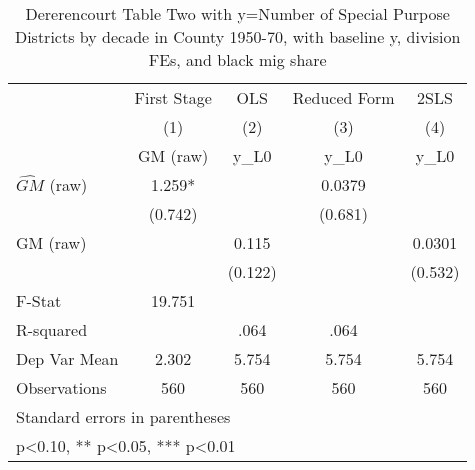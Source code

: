 \begin{table}[htbp]\centering
\def\sym#1{\ifmmode^{#1}\else\(^{#1}\)\fi}
\caption{Dererencourt Table Two with y=Number of Special Purpose Districts by decade in County 1950-70, with baseline y, division FEs, and black mig share}
\begin{tabular}{l*{4}{c}}
\toprule
                    & First Stage   &         OLS   &Reduced Form   &        2SLS   \\
                    &\multicolumn{1}{c}{(1)}&\multicolumn{1}{c}{(2)}&\multicolumn{1}{c}{(3)}&\multicolumn{1}{c}{(4)}\\
                    &\multicolumn{1}{c}{GM  (raw)}&\multicolumn{1}{c}{y\_L0}&\multicolumn{1}{c}{y\_L0}&\multicolumn{1}{c}{y\_L0}\\
\midrule
$\hat{GM}$ (raw)    &       1.259*  &               &      0.0379   &               \\
                    &     (0.742)   &               &     (0.681)   &               \\
\addlinespace
GM  (raw)           &               &       0.115   &               &      0.0301   \\
                    &               &     (0.122)   &               &     (0.532)   \\
\midrule
F-Stat              &      19.751   &               &               &               \\
R-squared           &               &        .064   &        .064   &               \\
Dep Var Mean        &       2.302   &       5.754   &       5.754   &       5.754   \\
Observations        &         560   &         560   &         560   &         560   \\
\bottomrule
\multicolumn{5}{l}{\footnotesize Standard errors in parentheses}\\
\multicolumn{5}{l}{\footnotesize * p<0.10, ** p<0.05, *** p<0.01}\\
\end{tabular}
\end{table}
